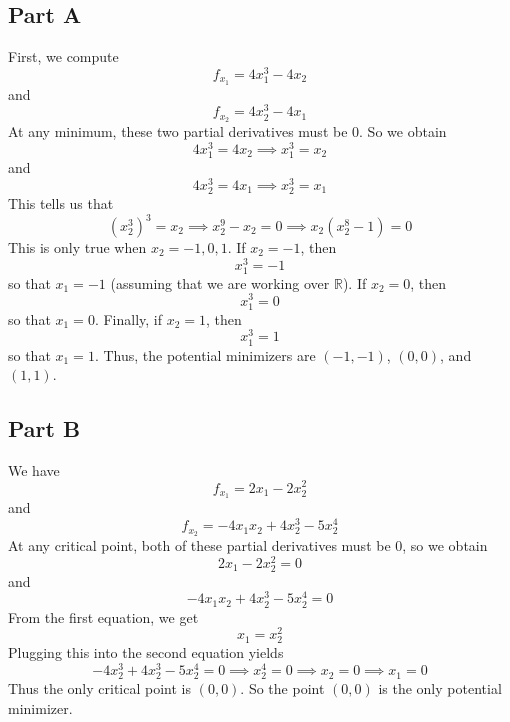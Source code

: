 \documentclass[12pt]{article}
\begin{document}
\subsection*{Part A}
First, we compute
\[
f_{x_1} = 4x_1^3 - 4x_2
\] and 
\[
f_{x_2} = 4x_2^3 - 4x_1
\] At any minimum, these two partial derivatives must be $0$. So we obtain
\[
4x_1^3 = 4x_2 \implies x_1^3 = x_2
\] and
\[
4x_2^3 = 4x_1 \implies x_2^3 = x_1
\] This tells us that
\[
(x_2^3)^3 = x_2 \implies x_2^9 - x_2 = 0 \implies x_2(x_2^8 - 1) = 0
\] This is only true when $x_2 = -1,0,1$. If $x_2 = -1$, then 
\[
x_1^3 = -1
\] so that $x_1 = -1$ (assuming that we are working over $\mathbb{R}$). If $x_2=0$, then
\[
x_1^3 = 0
\] so that $x_1 = 0$. Finally, if $x_2 = 1$, then
\[
x_1^3 = 1
\] so that $x_1 = 1$. Thus, the potential minimizers are $(-1,-1)$, $(0,0)$, and $(1,1)$.
\newpage
\subsection*{Part B}
We have
\[
f_{x_1} = 2x_1 - 2x_2^2
\] and
\[
f_{x_2} = -4x_1x_2 + 4x_2^3 - 5x_2^4
\] At any critical point, both of these partial derivatives must be $0$, so we obtain
\[
2x_1 - 2x_2^2 = 0
\] and
\[
-4x_1x_2 + 4x_2^3 - 5x_2^4 = 0
\] From the first equation, we get
\[
x_1 = x_2^2
\] Plugging this into the second equation yields
\[
-4x_2^3 + 4x_2^3 - 5x_2^4 = 0 \implies x_2^4 = 0 \implies x_2 = 0 \implies x_1 = 0
\]  Thus the only critical point is $(0,0)$. So the point $(0,0)$ is the only potential minimizer.
\newpage
\end{document}
